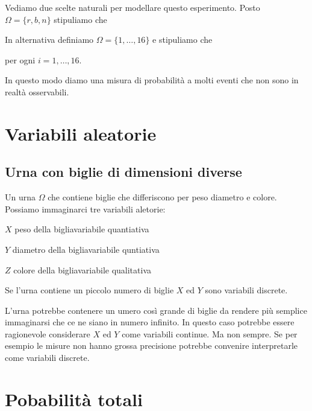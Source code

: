 \documentclass[11pt,openany]{book}
\begin{document}
Vediamo due scelte naturali per modellare questo esperimento. 
Posto $\Omega=\{r,b,n\}$ stipuliamo che




In alternativa definiamo $\Omega=\{1,\dots,16\}$ e 
stipuliamo che 

\hfil per ogni $i=1,\dots,16$.





In questo modo diamo una misura di probabilità a molti eventi che non sono in realtà osservabili. 



\hfill{}\clearpage\section{Variabili aleatorie}

\subsection{Urna con biglie di dimensioni diverse}
\label{Urna_biglie_diverse}

Un urna $\Omega$ che contiene biglie che differiscono per peso diametro e colore. Possiamo immaginarci tre variabili aletorie:

$X$ peso della biglia\hfill variabile quantiativa

$Y$ diametro della biglia\hfill variabile quntiativa

$Z$ colore della biglia\hfill variabile qualitativa

Se l'urna contiene un piccolo numero di biglie $X$ ed $Y$ sono variabili discrete.

L'urna potrebbe contenere un umero così grande di biglie da rendere più semplice immaginarsi che ce ne siano in numero infinito. In questo caso potrebbe essere ragionevole considerare $X$ ed $Y$ come variabili continue. Ma non sempre. Se per esempio le misure non hanno grossa precisione potrebbe convenire interpretarle come variabili discrete.

\hfill{}\clearpage\section{Pobabilità totali}
\end{document}
